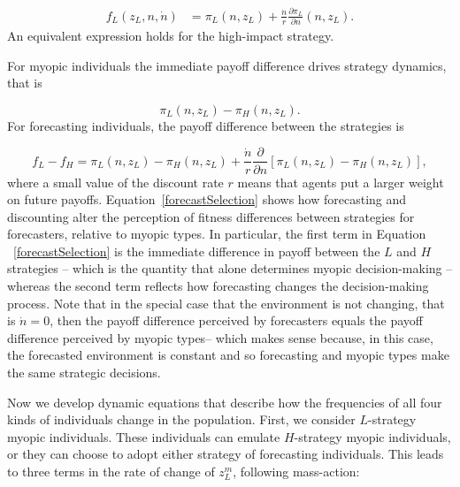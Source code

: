 \documentclass{article}
\begin{document}
\begin{align}
     f_L(z_L,n,\dot{n})&=%
     \pi_L(n,z_L)+\frac{\dot{n}}{r}\frac{\partial\pi_L}{\partial n}(n,z_L).
\end{align}
An equivalent expression holds for the high-impact strategy.

For myopic individuals the immediate payoff difference drives strategy dynamics, that is

\begin{equation}
   \pi_L(n,z_L)-\pi_H(n,z_L).
\end{equation}
For forecasting individuals, the payoff difference between the strategies is

\begin{equation}
    f_L-f_H = \pi_L(n,z_L)-\pi_H(n,z_L) + \frac{\dot{n}}{r}\frac{\partial }{\partial n}\left[\pi_L(n,z_L)-\pi_H(n,z_L)\right],
    \label{forecastSelection}
\end{equation}
where a small value of the discount rate $r$ means that agents put a larger weight on future payoffs. Equation~\ref{forecastSelection} shows how forecasting and discounting alter the perception of fitness differences between strategies for forecasters, relative to myopic types. In particular, the first term in Equation ~\ref{forecastSelection} is the immediate difference in payoff between the $L$ and $H$ strategies -- which is the quantity that alone determines myopic decision-making --  whereas the second term reflects how forecasting changes the decision-making process. Note that in the special case that the environment is not changing, that is $\dot{n}=0$, then the payoff difference perceived by forecasters equals the payoff difference perceived by myopic types-- which makes sense because, in this case, the forecasted environment is constant and so forecasting and myopic types make the same strategic decisions.

Now we develop dynamic equations that describe how the frequencies of all four kinds of individuals change in the population. First, we consider $L$-strategy myopic individuals. These individuals can emulate $H$-strategy myopic individuals, or they can choose to adopt either strategy of forecasting individuals. This leads to three terms in the rate of change of $z_L^m$,  following mass-action:
\end{document}

